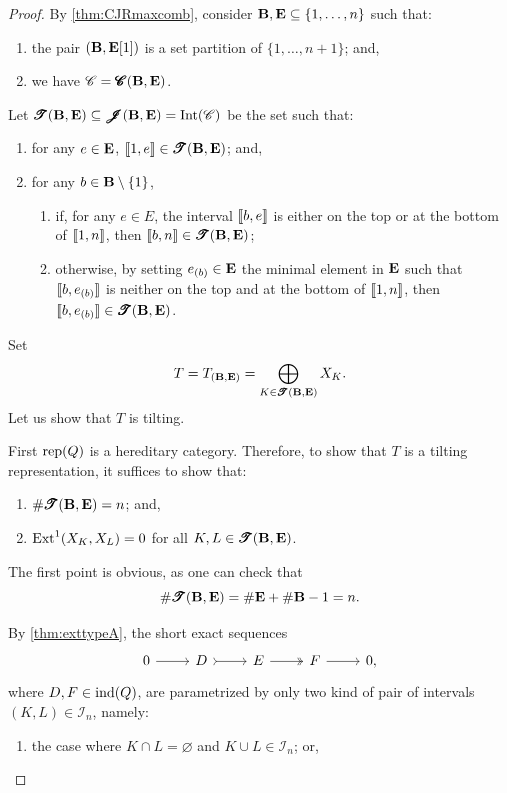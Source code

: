 \begin{proof}
    By \cref{thm:CJRmaxcomb}, consider $\mathbf B,\mathbf E \subseteq \{1,\ldots,n\}$ such that: \begin{enumerate}[label=$\bullet$,itemsep=1mm]
        \item the pair $(\mathbf B,\mathbf E[1])$ is a set partition of $\{1,\ldots,n+1\}$; and, 
        \item we have $\mathscr{C} = \operatorname{\pmb{\mathscr{C}}}(\mathbf B,\mathbf E)$.
    \end{enumerate}  
    Let $\pmb{\mathscr{T}}(\mathbf B, \mathbf E) \subseteq \operatorname{\pmb{\mathscr{J}}}(\mathbf B,\mathbf E) = \operatorname{Int}(\mathscr{C})$ be the set such that: 
    \begin{enumerate}[label=$\bullet$, itemsep=1mm]
        \item for any $e \in \mathbf E$, $\llbracket 1,e \rrbracket \in \pmb{\mathscr{T}}(\mathbf B,\mathbf E)$; and,
        \item for any $b \in \mathbf B \setminus \{1\}$,
        \begin{enumerate}[label=$\bullet$,itemsep=1mm]
            \item if, for any $e \in E$, the interval $\llbracket b,e \rrbracket$ is either on the top or at the bottom of $\llbracket 1,n \rrbracket$, then $\llbracket b,n \rrbracket \in \pmb{\mathscr{T}}(\mathbf B,\mathbf E)$; 
            \item otherwise, by setting $e_{(b)} \in \mathbf E$ the minimal element in $\mathbf E$ such that $\llbracket b,e_{(b)} \rrbracket$ is neither on the top and at the bottom of $\llbracket 1,n \rrbracket$, then $\llbracket b,e_{(b)} \rrbracket \in \pmb{\mathscr{T}}(\mathbf B,\mathbf E)$.
        \end{enumerate}
    \end{enumerate} Set \[T = T_{(\mathbf B,\mathbf E)} = \bigoplus_{K \in \pmb{\mathscr{T}}(\mathbf B,\mathbf E)} X_{K}.\]
    Let us show that $T$ is tilting.
    
    First $\operatorname{rep}(Q)$ is a hereditary category. Therefore, to show that $T$ is a tilting representation, it suffices to show that:
    \begin{enumerate}[label=$\bullet$, itemsep=1mm]
        \item $\# \pmb{\mathscr{T}}(\mathbf B,\mathbf E) = n$; and,
        \item  $\operatorname{Ext}^1(X_K, X_L) = 0$ for all $K,L \in \pmb{\mathscr{T}}(\mathbf B,\mathbf E)$.
    \end{enumerate}
    The first point is obvious, as one can check that
    \[\#\pmb{\mathscr{T}}(\mathbf B,\mathbf E) = \#\mathbf E + \#\mathbf B - 1 = n.\]  
    
    By \cref{thm:exttypeA}, the short exact sequences
    \[\begin{tikzcd}
	0 & D & E  & F &  0,
	\arrow[from=1-1, to=1-2]
	\arrow[tail, from=1-2, to=1-3]
	\arrow[two heads,from=1-3, to=1-4]
	\arrow[from=1-4, to=1-5]
\end{tikzcd}\] where $D,F \in  \operatorname{ind}(Q)$, are parametrized by only two kind of pair of intervals $(K,L) \in \mathcal{I}_n$, namely:
    \begin{enumerate}[label=$(\arabic*)$,itemsep=1mm]
        \item the case where $K \cap L = \varnothing$ and $K \cup L \in \mathcal{I}_n$; or,


\end{enumerate}
\end{proof}
